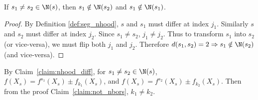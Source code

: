 \begin{claim}\label{claim:not_nbors}
If $s_1 \neq s_2 \in \N(s)$, then $s_1 \notin \N(s_2)$ and $s_1 \notin \N(s_1)$.
\end{claim}
\begin{proof}
By Definition \ref{def:seg_nhood}, $s$ and $s_1$ must differ at index $j_1$. Similarly $s$ and $s_2$ must differ at index $j_2$. Since $s_1 \neq s_2$, $j_1 \neq j_2$. Thus to transform $s_1$ into $s_2$ (or vice-versa), we must flip both $j_1$ and $j_2$. Therefore $d(s_1, s_2) = 2 \Rightarrow s_1 \notin \N(s_2)$ (and vice-versa).
\end{proof}

\begin{corollary}\label{co:not_nbors}
By Claim~\ref{claim:nhood_diff}, for $s_1 \neq s_2 \in \N(s)$, $f(X_s) = f^{s_1}(X_s) \pm f_{k_1}(X_s)$, and $f(X_s) = f^{s_2}(X_s) \pm f_{k_2}(X_s)$. Then from the proof Claim~\ref{claim:not_nbors}, $k_1 \neq k_2$.
\end{corollary}

